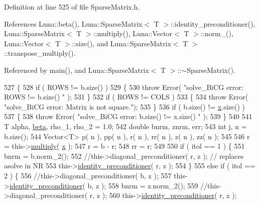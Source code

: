 Definition at line 525 of file Sparse\+Matrix.\+h.



References Luna\+::beta(), Luna\+::\+Sparse\+Matrix$<$ T $>$\+::identity\+\_\+preconditioner(), Luna\+::\+Sparse\+Matrix$<$ T $>$\+::multiply(), Luna\+::\+Vector$<$ T $>$\+::norm\+\_(), Luna\+::\+Vector$<$ T $>$\+::size(), and Luna\+::\+Sparse\+Matrix$<$ T $>$\+::transpose\+\_\+multiply().



Referenced by main(), and Luna\+::\+Sparse\+Matrix$<$ T $>$\+::$\sim$\+Sparse\+Matrix().


\begin{DoxyCode}
527   \{
528     \textcolor{keywordflow}{if} ( ROWS != b.size() )
529     \{
530       \textcolor{keywordflow}{throw} Error( \textcolor{stringliteral}{"solve\_BiCG error: ROWS != b.size() "} );
531     \}
532     \textcolor{keywordflow}{if} ( ROWS != COLS )
533     \{
534       \textcolor{keywordflow}{throw} Error( \textcolor{stringliteral}{"solve\_BiCG error: Matrix is not square."});
535     \}
536     \textcolor{keywordflow}{if} ( b.size() != \hyperlink{namespaceHeat__plot_aa88370c16b85b784ccbde3ed88bc1991}{x}.size() )
537     \{
538       \textcolor{keywordflow}{throw} Error( \textcolor{stringliteral}{"solve\_BiCG error: b.size() != x.size() "} );
539     \}
540 
541     T alpha, \hyperlink{namespaceLuna_af542f1c7522ca96017105e160b54df80}{beta}, rho\_1, rho\_2 = 1.0;
542     \textcolor{keywordtype}{double} bnrm, znrm, err;
543     \textcolor{keywordtype}{int} j, n = b.size();
544     Vector<T> p( n ), pp( n ), r( n ), rr( n ), z( n ), zz( n );
545 
546     r = this->\hyperlink{classLuna_1_1SparseMatrix_a532c8a8b80b0accf950a642344e7954f}{multiply}( \hyperlink{namespaceHeat__plot_aa88370c16b85b784ccbde3ed88bc1991}{x} );
547     r = b - r;
548     rr = r;
549 
550     \textcolor{keywordflow}{if} ( itol == 1 ) \{
551       bnrm = b.norm\_2();
552       \textcolor{comment}{//this->diagonal\_preconditioner( r, z );           // replaces asolve in NR}
553       this->\hyperlink{classLuna_1_1SparseMatrix_ac196d00210b58f3f62352054f4241411}{identity\_preconditioner}( r, z );
554     \}
555     \textcolor{keywordflow}{else} \textcolor{keywordflow}{if} ( itol == 2 ) \{
556       \textcolor{comment}{//this->diagonal\_preconditioner( b, z );}
557       this->\hyperlink{classLuna_1_1SparseMatrix_ac196d00210b58f3f62352054f4241411}{identity\_preconditioner}( b, z );
558       bnrm = z.norm\_2();
559       \textcolor{comment}{//this->diagonal\_preconditioner( r, z );}
560       this->\hyperlink{classLuna_1_1SparseMatrix_ac196d00210b58f3f62352054f4241411}{identity\_preconditioner}( r, z );

\end{DoxyCode}
